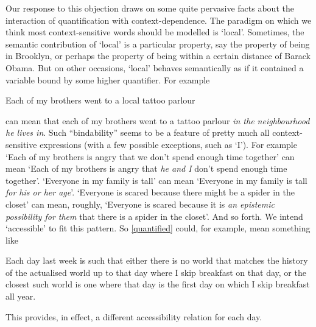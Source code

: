 \documentclass[If.tex]{subfiles}
\begin{document}
Our response to this objection draws on some quite pervasive facts about the interaction of quantification with context-dependence. The paradigm on which we think most context-sensitive words should be modelled is ‘local’. Sometimes, the semantic contribution of ‘local’ is a particular property, say the property of being in Brooklyn, or perhaps the property of being within a certain distance of Barack Obama. But on other occasions, ‘local’ behaves semantically as if it contained a variable bound by some higher quantifier. For example
\begin{prop}
	\nitem 
		Each of my brothers went to a local tattoo parlour
\end{prop}
can mean that each of my brothers went to a tattoo parlour \emph{in the neighbourhood he lives in}. Such “bindability” seems to be a feature of pretty much all context-sensitive expressions (with a few possible exceptions, such as ‘I’). For example ‘Each of my brothers is angry that we don't spend enough time together’ can mean ‘Each of my brothers is angry that \emph{he and I} don't spend enough time together’. ‘Everyone in my family is tall’ can mean ‘Everyone in my family is tall \emph{for his or her age}’. ‘Everyone is scared because there might be a spider in the closet’ can mean, roughly, ‘Everyone is scared because it is \emph{an epistemic possibility for them} that there is a spider in the closet’. And so forth. We intend ‘accessible’ to fit this pattern. So \ref{quantified} could, for example, mean something like
\begin{prop}
	\nitem 
		Each day last week is such that either there is no world that matches the history of the actualised world up to that day where I skip breakfast on that day, or the closest such world is one where that day is the first day on which I skip breakfast all year.
\end{prop}
This provides, in effect, a different accessibility relation for each day.
\end{document}
